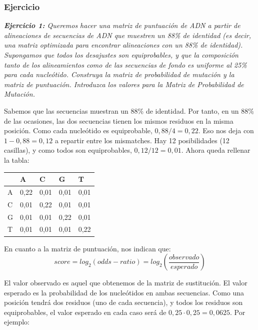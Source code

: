 
\subsubsection{Ejercicio}
\textit{\textbf{Ejercicio 1:} Queremos hacer una matriz de puntuación de ADN a partir de alineaciones de secuencias de ADN que muestren un 88\% de identidad (es decir, una matriz optimizada para encontrar alineaciones con un 88\% de identidad). Supongamos que todos los desajustes son equiprobables, y que la composición tanto de los alineamientos como de las secuencias de fondo es uniforme al 25\% para cada nucleótido. Construya la matriz de probabilidad de mutación y la matriz de puntuación. Introduzca los valores para la Matriz de Probabilidad de Mutación.}

Sabemos que las secuencias muestran un 88\% de identidad. Por tanto, en un 88\% de las ocasiones, las dos secuencias tienen los mismos residuos en la misma posición. Como cada nucleótido es equiprobable, $0,88/4 = 0,22$. Eso nos deja con $1 - 0,88 = 0,12$ a repartir entre los mismatches. Hay 12 posibilidades (12 casillas), y como todos son equiprobables, $0,12 / 12 = 0,01$. Ahora queda rellenar la tabla:

\begin{table}[htbp]
    \centering
    \begin{tabularx}{\textwidth}{ X | X X X X}
          & A & C & G & T \\ \hline
         A & 0,22 & 0,01 & 0,01 & 0,01 \\
         C & 0,01 & 0,22& 0,01 & 0,01 \\
         G & 0,01 & 0,01 & 0,22 & 0,01 \\
         T & 0,01 & 0,01 & 0,01 & 0,22 \\
    \end{tabularx}
\end{table}

En cuanto a la matriz de puntuación, nos indican que:
$$score = log_2(odds-ratio) = log_2(\frac{observado}{esperado})$$

El valor observado es aquel que obtenemos de la matriz de sustitución. El valor esperado es la probabilidad de los nucleótidos en ambas secuencias. Como una posición tendrá dos residuos (uno de cada secuencia), y todos los residuos son equiprobables, el valor esperado en cada caso será de $0,25 \cdot 0,25 = 0,0625$. Por ejemplo:

